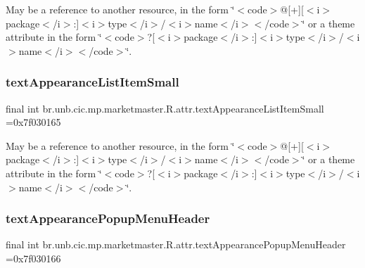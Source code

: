 May be a reference to another resource, in the form \char`\"{}$<$code$>$@\mbox{[}+\mbox{]}\mbox{[}$<$i$>$package$<$/i$>$\+:\mbox{]}$<$i$>$type$<$/i$>$/$<$i$>$name$<$/i$>$$<$/code$>$\char`\"{} or a theme attribute in the form \char`\"{}$<$code$>$?\mbox{[}$<$i$>$package$<$/i$>$\+:\mbox{]}$<$i$>$type$<$/i$>$/$<$i$>$name$<$/i$>$$<$/code$>$\char`\"{}. \mbox{\label{classbr_1_1unb_1_1cic_1_1mp_1_1marketmaster_1_1R_1_1attr_abf49abec6f7058b40fcf1a79cc826c95}} 
\subsubsection{\texorpdfstring{text\+Appearance\+List\+Item\+Small}{textAppearanceListItemSmall}}
{\footnotesize\ttfamily final int br.\+unb.\+cic.\+mp.\+marketmaster.\+R.\+attr.\+text\+Appearance\+List\+Item\+Small =0x7f030165\hspace{0.3cm}{\ttfamily [static]}}

May be a reference to another resource, in the form \char`\"{}$<$code$>$@\mbox{[}+\mbox{]}\mbox{[}$<$i$>$package$<$/i$>$\+:\mbox{]}$<$i$>$type$<$/i$>$/$<$i$>$name$<$/i$>$$<$/code$>$\char`\"{} or a theme attribute in the form \char`\"{}$<$code$>$?\mbox{[}$<$i$>$package$<$/i$>$\+:\mbox{]}$<$i$>$type$<$/i$>$/$<$i$>$name$<$/i$>$$<$/code$>$\char`\"{}. \mbox{\label{classbr_1_1unb_1_1cic_1_1mp_1_1marketmaster_1_1R_1_1attr_adc772b247194845e97d298d69175bc27}} 
\subsubsection{\texorpdfstring{text\+Appearance\+Popup\+Menu\+Header}{textAppearancePopupMenuHeader}}
{\footnotesize\ttfamily final int br.\+unb.\+cic.\+mp.\+marketmaster.\+R.\+attr.\+text\+Appearance\+Popup\+Menu\+Header =0x7f030166\hspace{0.3cm}{\ttfamily [static]}}

